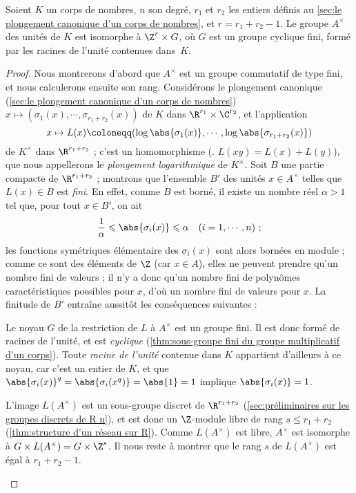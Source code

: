 \documentclass[11pt, useosf,
  title in boldface,
  theorem in new line,
  theorem numbering = section,
  number theorems separately,
]{simplivre}
\begin{document}
    \begin{theorem}[Dirichlet]\label{thm:unité}
        Soient \( K \) un corps de nombres, \( n \) son degré, \( r_1 \) et \( r_2 \) les entiers définis au \cref{sec:le plongement canonique d'un corps de nombres}, et \( r = r_1 + r_2 - 1 \). Le groupe \( A^\times \) des unités de \( K \) est isomorphe à \( \Z^r \times G \), où \( G \) est un groupe cyclique fini, formé par les racines de l'unité contenues dans~\( K \).
    \end{theorem}
    \begin{proof}
        Nous montrerons d'abord que \( A^\times \) est un groupe commutatif de type fini, et nous calculerons ensuite son rang. Considérons le plongement canonique (\cref{sec:le plongement canonique d'un corps de nombres}) \( x \mapsto (\sigma_1(x), \cdots, \sigma_{r_1+r_2}(x)) \) de \( K \) dans \( \R^{r_1} \times \C^{r_2} \), et l'application
        \begin{equation}
            x \mapsto L(x) \coloneqq (\log\abs{\sigma_1(x)}, \cdots, \log\abs{\sigma_{r_1+r_2}(x)})
        \end{equation}
        de \( K^\times \) dans \( \R^{r_1+r_2} \) ; c'est un homomorphisme (\ie. \( L(xy) = L(x)+L(y) \)), que nous appellerons le \emph{plongement logarithmique} de \( K^\times \). Soit \( B \) une partie compacte de \( \R^{r_1+r_2} \) ; montrons que l'ensemble \( B' \) des unités \( x \in A^\times \) telles que \( L(x) \in B \) est \emph{fini}. En effet, comme \( B \) est borné, il existe un nombre réel \( \alpha > 1 \) tel que, pour tout \( x \in B' \), on ait
        \[
            \frac{1}{\alpha} \leqslant \abs{\sigma_i(x)} \leqslant \alpha \quad \text{(\( i = 1, \cdots, n \))} ~;
        \]
        les fonctions symétriques élémentaire des \( \sigma_i(x) \) sont alors bornées en module ; comme ce sont des éléments de \( \Z \) (car \( x \in A \)), elles ne peuvent prendre qu'un nombre fini de valeurs ; il n'y a donc qu'un nombre fini de polynômes caractéristiques possibles pour \( x \), d'où un nombre fini de valeurs pour \( x \). La finitude de \( B' \) entraîne aussitôt les conséquences suivantes :
        \begin{enumerate-alph}
            \item Le noyau \( G \) de la restriction de \( L \) à \( A^\times \) est un groupe fini. Il est donc formé de racines de l'unité, et est \emph{cyclique} (\cref{thm:sous-groupe fini du groupe multiplicatif d'un corps}). Toute \emph{racine de l'unité} contenue dans \( K \) appartient d'ailleurs à ce noyau, car c'est un entier de \( K \), et que \( \abs{\sigma_i(x)}^q = \abs{\sigma_i(x^q)} = \abs{1} = 1 \) implique \( \abs{\sigma_i(x)} = 1 \).
            \item L'image \( L(A^\times) \) est un sous-groupe discret de \( \R^{r_1+r_2} \) (\cref{sec:préliminaires sur les groupes discrets de R n}), et est donc un \( \Z \)‑module libre de rang \( s \leqslant r_1+r_2 \) (\cref{thm:structure d'un réseau sur R}). Comme \( L(A^\times) \) est libre, \( A^\times \) est isomorphe à \( G \times L(A^\times) = G \times \Z^{s} \). Il nous reste à montrer que le rang \( s \) de \( L(A^\times) \) est égal à \( r_1+r_2-1 \).
        \end{enumerate-alph}


\end{proof}
\end{document}
